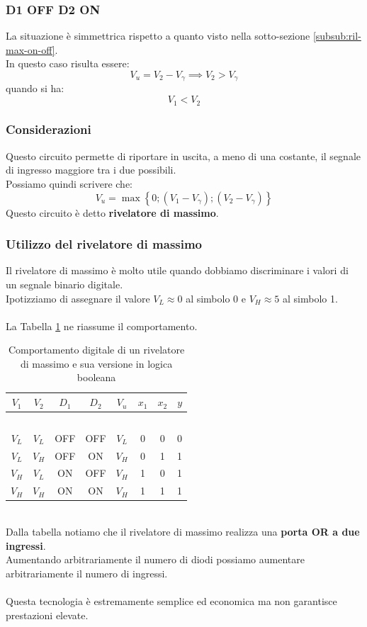 \documentclass[../main.tex]{subfiles}
\begin{document}
	\subsubsection{D1 OFF D2 ON}
	La situazione è simmettrica rispetto a quanto visto nella sotto-sezione \ref{subsub:ril-max-on-off}. \\
	In questo caso risulta essere:
	$$V_u = V_2 - V_\gamma \implies V_2 > V_\gamma$$
	quando si ha:
	$$V_1 < V_2$$
	\subsubsection{Considerazioni}
	Questo circuito permette di riportare in uscita, a meno di una costante, il segnale di ingresso maggiore tra i due possibili.\\
	Possiamo quindi scrivere che:
	$$V_u = \max \left\{ 0; (V_1 - V_\gamma); (V_2 - V_\gamma) \right\}$$
	Questo circuito è detto \textbf{rivelatore di massimo}.
	\subsubsection{Utilizzo del rivelatore di massimo}
	Il rivelatore di massimo è molto utile quando dobbiamo discriminare i valori di un segnale binario digitale. \\
	Ipotizziamo di assegnare il valore $V_L \approx 0$ al simbolo 0 e $V_H \approx 5$ al simbolo 1.\\\\
	La Tabella \ref{tab:table-3} ne riassume il comportamento.
	\begin{table}[ht]
		\centering
		\begin{tabular}{|c|c|c|c|c|c|c|c|}
			\hline
			$V_1$ & $V_2$ & $D_1$ & $D_2$ & $V_u$ & $x_1$ & $x_2$ & $y$ \\ \hline
			\multicolumn{8}{|c|}{$\quad$} \\ [-0.8em] \hline
			$V_L$ & $V_L$ & OFF & OFF & $V_L$ & 0 & 0 & 0 \\ \hline
			$V_L$ & $V_H$ & OFF & ON  & $V_H$ & 0 & 1 & 1 \\ \hline
			$V_H$ & $V_L$ & ON  & OFF & $V_H$ & 1 & 0 & 1 \\ \hline
			$V_H$ & $V_H$ & ON  & ON  & $V_H$ & 1 & 1 & 1 \\ \hline
		\end{tabular}
		\caption{Comportamento digitale di un rivelatore di massimo e sua versione in logica booleana}
		\label{tab:table-3}
	\end{table}
	\\Dalla tabella notiamo che il rivelatore di massimo realizza una \textbf{porta OR a due ingressi}. \\
	Aumentando arbitrariamente il numero di diodi possiamo aumentare arbitrariamente il numero di ingressi.\\\\
	Questa tecnologia è estremamente semplice ed economica ma non garantisce prestazioni elevate.
\end{document}
